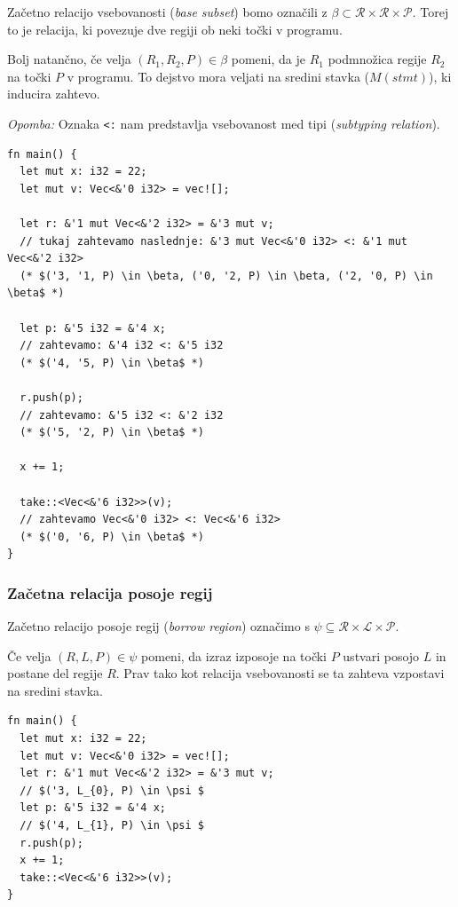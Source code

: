 \documentclass[a4paper,12pt,openright]{book}
\begin{document}
Začetno relacijo vsebovanosti (\textit{base subset}) bomo označili z
$\beta \subset \mathcal{R} \times \mathcal{R} \times \mathcal{P}$. Torej to je relacija, ki povezuje dve regiji
ob neki točki v programu.

Bolj natančno, če velja $(R_{1}, R_{2}, P) \in \beta$ pomeni, da je $R_{1}$ podmnožica regije $R_{2}$ na točki $P$ v programu.
To dejstvo mora veljati na sredini stavka ($M(stmt)$), ki inducira zahtevo.

\textit{Opomba:} Oznaka \verb|<:| nam predstavlja vsebovanost med tipi (\textit{subtyping relation}).

\begin{lstlisting}
fn main() {
  let mut x: i32 = 22;
  let mut v: Vec<&'0 i32> = vec![];

  let r: &'1 mut Vec<&'2 i32> = &'3 mut v; 
  // tukaj zahtevamo naslednje: &'3 mut Vec<&'0 i32> <: &'1 mut Vec<&'2 i32> 
  (* $('3, '1, P) \in \beta, ('0, '2, P) \in \beta, ('2, '0, P) \in \beta$ *)

  let p: &'5 i32 = &'4 x; 
  // zahtevamo: &'4 i32 <: &'5 i32
  (* $('4, '5, P) \in \beta$ *)

  r.push(p);
  // zahtevamo: &'5 i32 <: &'2 i32
  (* $('5, '2, P) \in \beta$ *)

  x += 1;

  take::<Vec<&'6 i32>>(v);
  // zahtevamo Vec<&'0 i32> <: Vec<&'6 i32>
  (* $('0, '6, P) \in \beta$ *)
}
\end{lstlisting}

\subsubsection{Začetna relacija posoje regij}

Začetno relacijo posoje regij (\textit{borrow region}) označimo s $\psi \subseteq \mathcal{R} \times \mathcal{L} \times \mathcal{P}$.

Če velja $(R,L,P) \in \psi$ pomeni, da izraz izposoje na točki $P$ ustvari posojo $L$ in postane del
regije $R$. Prav tako kot relacija vsebovanosti se ta zahteva vzpostavi na sredini stavka.

\begin{lstlisting}
fn main() {
  let mut x: i32 = 22;
  let mut v: Vec<&'0 i32> = vec![];
  let r: &'1 mut Vec<&'2 i32> = &'3 mut v; 
  // $('3, L_{0}, P) \in \psi $
  let p: &'5 i32 = &'4 x; 
  // $('4, L_{1}, P) \in \psi $
  r.push(p);
  x += 1;
  take::<Vec<&'6 i32>>(v);
}
\end{lstlisting}
\end{document}
